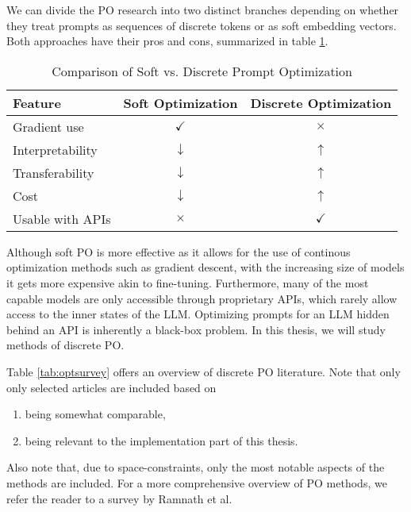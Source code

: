 We can divide the PO research into two distinct branches depending on whether 
they treat prompts as sequences of discrete tokens or as soft embedding vectors. 
Both approaches have their pros and cons, summarized in table \ref{tab:disxcont}.
\begin{table}[htbp]
    \centering
    \caption{Comparison of Soft vs. Discrete Prompt Optimization}\label{tab:disxcont}
    \begin{tabular}{lcc}
    \toprule
    \textbf{Feature} & \textbf{Soft Optimization} & \textbf{Discrete Optimization} \\
    \midrule
    Gradient use      & $\checkmark$   & $\times$ \\
    Interpretability  & $\downarrow$ & $\uparrow$ \\
    Transferability  & $\downarrow$ & $\uparrow$ \\
    Cost  & $\downarrow$ & $\uparrow$ \\
    Usable with APIs  & $\times$   & $\checkmark$ \\
    \bottomrule
    \end{tabular}
    \end{table}

Although soft PO is more effective as it allows for the use of 
continous optimization methods such as gradient descent, with the increasing size of models
it gets more expensive akin to fine-tuning. Furthermore, many of the most capable models are 
only accessible through proprietary APIs, which rarely allow access to the inner states of the LLM.
Optimizing prompts for an LLM hidden behind an API is inherently a black-box problem.
In this thesis, we will study methods of discrete PO.

Table \ref{tab:optsurvey} offers an overview of discrete PO literature. Note that only only selected articles are included based on
\begin{enumerate}
    \item being somewhat comparable,
    \item being relevant to the implementation part of this thesis.
\end{enumerate}
Also note that, due to space-constraints, only the most notable aspects of the methods are included. 
For a more comprehensive overview of PO methods, we refer the reader to a survey\cite{ramnath2025systematicsurveyautomaticprompt} by Ramnath et al.

